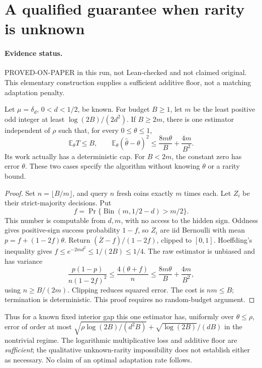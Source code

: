 \section{A qualified guarantee when rarity is unknown}
\paragraph{Evidence status.} PROVED-ON-PAPER in this run, not Lean-checked and
not claimed original. This elementary construction supplies a sufficient
additive floor, not a matching adaptation penalty.

\begin{proposition}
Let $\mu=\delta_d$, $0<d<1/2$, be known. For budget $B\ge1$, let $m$ be the
least positive odd integer at least $\log(2B)/(2d^2)$. If $B\ge2m$, there is
one estimator independent of $\rho$ such that, for every $0\le\theta\le1$,
\[
 \mathbb E_\theta T\le B,\qquad
 \mathbb E_\theta(\widehat\theta-\theta)^2
 \le \frac{8m\theta}{B}+\frac{4m}{B^2}.
\]
Its work actually has a deterministic cap. For $B<2m$, the constant zero
has error $\theta$. These two cases specify the algorithm without knowing
$\theta$ or a rarity bound.
\end{proposition}
\begin{proof}
Set $n=\lfloor B/m\rfloor$, and query $n$ fresh coins exactly $m$ times each.
Let $Z_i$ be their strict-majority decisions. Put
\[
 f=\Pr\{\operatorname{Bin}(m,1/2-d)>m/2\}.
\]
This number is computable from $d,m$, with no access to the hidden sign.
Oddness gives positive-sign success probability $1-f$, so
$Z_i$ are iid Bernoulli with mean $p=f+(1-2f)\theta$.
Return $(\overline Z-f)/(1-2f)$, clipped to $[0,1]$.
Hoeffding's inequality gives $f\le e^{-2md^2}\le1/(2B)\le1/4$.
The raw estimator is unbiased and has variance
\[
 \frac{p(1-p)}{n(1-2f)^2}
 \le\frac{4(\theta+f)}n
 \le\frac{8m\theta}{B}+\frac{4m}{B^2},
\]
using $n\ge B/(2m)$. Clipping reduces squared error. The cost is $nm\le B$;
termination is deterministic. This proof requires no random-budget argument.
\end{proof}

Thus for a known fixed interior gap this one estimator has, uniformly over
$\theta\le\rho$, error of order at most
$\sqrt{\rho\log(2B)/(d^2B)}+\sqrt{\log(2B)}/(dB)$ in the nontrivial regime.
The logarithmic multiplicative loss and additive floor are \emph{sufficient};
the qualitative unknown-rarity impossibility does not establish either as
necessary. No claim of an optimal adaptation rate follows.

